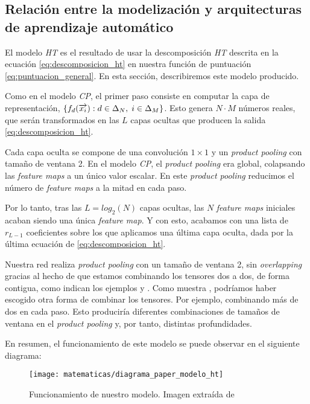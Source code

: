 \subsection{Relación entre la modelización y arquitecturas de aprendizaje automático}

El modelo \textit{HT} es el resultado de usar la descomposición \textit{HT} descrita en la ecuación \eqref{eq:descomposicion_ht} en nuestra función de puntuación \eqref{eq:puntuacion_general}. En esta sección, describiremos este modelo producido.

Como en el modelo \textit{CP}, el primer paso consiste en computar la capa de representación, $\{f_d(\overrightarrow{x_i}): d \in \Delta_{N}, \; i \in \Delta_{M}\}$. Esto genera $N \cdot M$ números reales, que serán transformados en las $L$ capas ocultas que producen la salida \eqref{eq:descomposicion_ht}.

Cada capa oculta se compone de una convolución $1 \times 1$ y un \textit{product pooling} con tamaño de ventana 2. En el modelo \textit{CP}, el \textit{product pooling} era global, colapsando las \textit{feature maps} a un único valor escalar. En este \textit{product pooling} reducimos el número de \textit{feature maps} a la mitad en cada paso.

Por lo tanto, tras las $L = log_2(N)$ capas ocultas, las $N$ \textit{feature maps} iniciales acaban siendo una única \textit{feature map}. Y con esto, acabamos con una lista de $r_{L - 1}$ coeficientes sobre los que aplicamos una última capa oculta, dada por la última ecuación de \eqref{eq:descomposicion_ht}.

Nuestra red realiza \textit{product pooling} con un tamaño de ventana 2, sin \textit{overlapping} gracias al hecho de que estamos combinando los tensores dos a dos, de forma contigua, como indican los ejemplos  y . Como muestra \cite{matematicas:descomposicion_ht}, podríamos haber escogido otra forma de combinar los tensores. Por ejemplo, combinando más de dos en cada paso. Esto produciría diferentes combinaciones de tamaños de ventana en el \textit{product pooling} y, por tanto, distintas profundidades.

En resumen, el funcionamiento de este modelo se puede observar en el siguiente diagrama:

\begin{figure}[H]
	\centering
	\texttt{[image: matematicas/diagrama\_paper\_modelo\_ht]}
	\caption{Funcionamiento de nuestro modelo. Imagen extraída de \cite{matematicas:principal}}
\end{figure}

